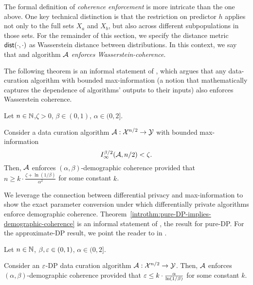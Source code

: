 The formal definition of \emph{coherence enforcement} is more intricate than the one above. One key technical distinction is that the restriction on predictor $h$ applies not only to the full sets $X_a$ and $X_b$, but also across different subpopulations in those sets. For the remainder of this section, we specify the distance metric $\mathsf{dist}(\cdot,\cdot)$ as Wasserstein distance between distributions. In this context, we say that and algorithm $\mathcal{A}$ \emph{enforces Wasserstein-coherence}.

The following theorem is an informal statement of , which argues that any data-curation algorithm with bounded max-information \cite{DworkFHPRR15} (a notion that mathematically captures the dependence of algorithms' outputs to their inputs) also enforces Wasserstein coherence. 
\begin{theorem}\label{introthm:max-info-implies-demographic-coherence}
    Let $n\in\mathbb{N}$,$\zeta>0$, $\beta \in (0,1)$, $\alpha \in (0,2]$.  %
    
   Consider a data curation algorithm ${\mathcal{A}:\mathcal{X}^{n/2}\to \mathcal{Y}}$ with bounded max-information 
    $$I^{\beta/2}_{\infty}(\mathcal{A},n/2) < \zeta.$$
   Then, $\mathcal{A}$ enforces $(\alpha,\beta)$-demographic coherence provided that $n \geq k\cdot\frac{\zeta + \ln(1/\beta)}{\alpha^2}$ for some constant $k$.
\end{theorem}

We leverage the connection between differential privacy and max-information to show the exact parameter conversion under which differentially private algorithms enforce demographic coherence.  
Theorem~\ref{introthm:pure-DP-implies-demographic-coherence} is an informal statement of , the result for pure-DP. For the approximate-DP result, we point the reader to  in .

\begin{theorem}\label{introthm:pure-DP-implies-demographic-coherence}
    Let $n\in\mathbb{N}$, $\beta, \varepsilon \in (0,1)$, $\alpha \in (0,2]$.
    
   Consider an $\varepsilon$-DP data curation algorithm ${\mathcal{A}:\mathcal{X}^{n/2}\to \mathcal{Y}}$.
   Then, $\mathcal{A}$ enforces $(\alpha,\beta)$-demographic coherence provided that $\varepsilon \leq k \cdot \frac{\alpha}{\ln(1/\beta)}$ for some constant $k$.
\end{theorem}

